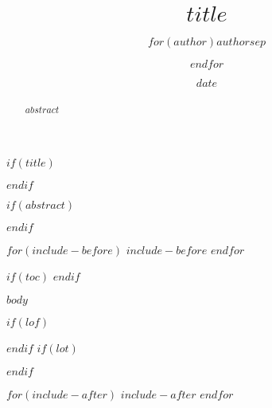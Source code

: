 \documentclass[oneside]{tuftish-ebook}
\title{$title$}
\author{$for(author)$$author$$sep$ \and $endfor$}
\date{$date$}
\begin{document}
$if(title)$
\maketitle
$endif$

$if(abstract)$
\begin{abstract}
\noindent $abstract$
\end{abstract}
$endif$

$for(include-before)$
$include-before$
$endfor$

$if(toc)$
\hypersetup{linkcolor=blue}
\setcounter{tocdepth}{$toc-depth$}
\tableofcontents
$endif$

$body$

\backmatter
$if(lof)$
\listoffigures
$endif$
$if(lot)$
\listoftables
$endif$

\begin{fullwidth}
\begin{multicols}{2}
\printindex
\end{multicols}
\end{fullwidth}

$for(include-after)$
$include-after$
$endfor$
\end{document}
